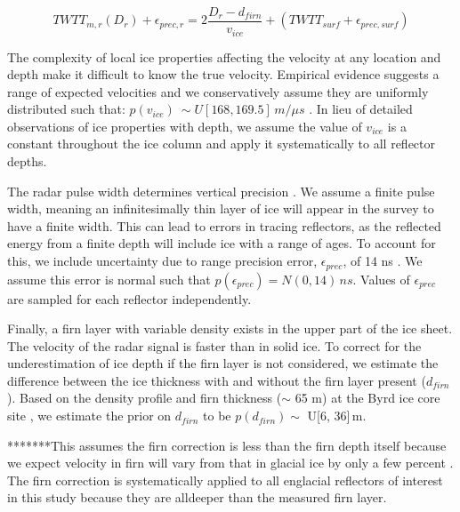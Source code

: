 \begin{equation}\label{deptheqn}
TWTT_{m,r}(D_r) + \epsilon_{prec,r} = 2 \frac{D_r - d_{firn}}{v_{ice}} + (TWTT_{surf} + \epsilon_{prec,surf})
\end{equation}

The complexity of local ice properties affecting the velocity at any location and depth make it difficult to know the true velocity. Empirical evidence suggests a range of expected velocities and we conservatively assume they are uniformly distributed such that: $p(v_{ice}) ~\sim U[168,169.5]\,m/{\mu}s$ \citep{fujita2000}. In lieu of detailed observations of ice properties with depth, we assume the value of $v_{ice}$ is a constant throughout the ice column and apply it systematically to all reflector depths.

The radar pulse width determines vertical precision \citep{millar1982}. We assume a finite pulse width, meaning an infinitesimally thin layer of ice will appear in the survey to have a finite width. This can lead to errors in tracing reflectors, as the reflected energy from a finite depth will include ice with a range of ages. To account for this, we include uncertainty due to range precision error, $\epsilon_{prec}$, of 14 ns \citep{cavitte2016}. We assume this error is normal such that $p(\epsilon_{prec}) = N(0,14)\,ns$. Values of $\epsilon_{prec}$ are sampled for each reflector independently.

Finally, a firn layer with variable density exists in the upper part of the ice sheet. The velocity of the radar signal is faster than in solid ice. To correct for the underestimation of ice depth if the firn layer is not considered, we estimate the difference between the ice thickness with and without the firn layer present ($d_{firn}$). Based on the density profile and firn thickness ($\sim$ 65 m) at the Byrd ice core site \citep{gow1970}, we estimate the prior on $d_{firn}$ to be $p(d_{firn})\sim$ U[6, 36]\,m. 

*******This assumes the firn correction is less than the firn depth itself because we expect velocity in firn will vary from that in glacial ice by only a few percent \citep{robin1975}.  The firn correction is systematically applied to all englacial reflectors of interest in this study because they are alldeeper than the measured firn layer.%

